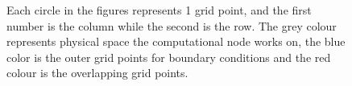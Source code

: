 	\begin{figure}
		\centering
			
		\caption{Each circle in the figures represents 1 grid point, and the first number is the column while the second is the row. The grey colour represents physical space the computational node works on, the blue color is the outer grid points for boundary conditions and the red colour is the overlapping grid points.}
		\label{fig:domain_part}
    \end{figure}
